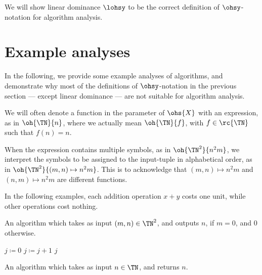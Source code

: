 \documentclass[b5paper, english, oneside]{memoir}
\begin{document}
We will show linear dominance $\lohsy$ to be the correct definition of $\ohsy$-notation for algorithm analysis.

\section{Example analyses}

In the following, we provide some example analyses of algorithms, and demonstrate why most of the definitions of $\ohsy$-notation in the previous section --- except linear dominance --- are not suitable for algorithm analysis.

\begin{note}
We will often denote a function in the parameter of $\ohs{X}$ with an expression, as in $\oh{\TN}{n}$, where we actually mean $\oh{\TN}{f}$, with $f \in \rc{\TN}$ such that $f(n) = n$. 

When the expression contains multiple symbols, as in $\oh{\TN^2}{n^2 m}$, we interpret the symbols to be assigned to the input-tuple in alphabetical order, as in $\oh{\TN^2}{(m, n) \mapsto n^2 m}$. This is to acknowledge that $(m, n) \mapsto n^2 m$ and $(n, m) \mapsto n^2 m$ are different functions.
\end{note}

\begin{note}
In the following examples, each addition operation $x + y$ costs one unit, while other operations cost nothing.
\end{note}

\begin{algorithm}
\caption{An algorithm which takes as input $(m, n) \in \TN^2$, and outputs $n$, if $m = 0$, and $0$ otherwise.}
\label{alg:ConstantComplexity}
\begin{algorithmic}[1]
\State $j \coloneqq 0$
    \State $j \coloneqq j + 1$
  \EndFor
\EndIf
\State \Return $j$
\EndProcedure
\end{algorithmic}
\end{algorithm}

\begin{algorithm}
\caption{An algorithm which takes as input $n \in \TN$, and returns $n$.}
\label{alg:BasicAnalysis}
\begin{algorithmic}[1]
  \State \Return {}
\EndProcedure
\end{algorithmic}
\end{algorithm}
\end{document}
